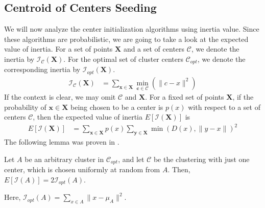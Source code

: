 \documentclass[twoside, 11pt]{article}
\newcommand{\x}{\mathbf{x}}
\newcommand{\X}{\mathbf{X}}
\newcommand{\y}{\mathbf{y}}
\renewcommand{\c}{\mathbf{c}}
\newcommand{\C}{\mathcal{C}}
\newcommand{\I}{\mathcal{I}}
\begin{document}
	\subsection{Centroid of Centers Seeding}
	We will now analyze the center initialization algorithms using inertia value. Since these algorithms are probabilistic, we are going to take a look at the expected value of inertia. For a set of points $\X$ and a set of centers $\C$, we denote the inertia by $\I_\C(\X)$. For the optimal set of cluster centers $\C_{opt}$, we denote the corresponding inertia by $\I_{opt}(\X)$.
		\begin{align*}
			\I_\C(\X) & = \sum_{\x\in\X}\min_{\c\in\C}(\|c-x\|^2)
		\end{align*}
	If the context is clear, we may omit $\C$ and $\X$. For a fixed set of points $\X$, if the probability of $\x\in\X$ being chosen to be a center is $p(x)$ with respect to a set of centers $\C$, then the expected value of inertia $E[\I(\X)]$ is
		\begin{align*}
			E[\I(\X)] & = \sum_{\x\in\X}p(x)\sum_{\y\in\X}\min(D(x),\|y-x\|)^2
		\end{align*}
	The following lemma was proven in \cite[Lemma $3.2$]{kmeans++}.
		\begin{lemma}
			Let $A$ be an arbitrary cluster in $\C_{opt}$, and let $\C$ be the clustering with just one center, which is chosen uniformly at random from $A$. Then, $E[\I(A)]=2\I_{opt}(A)$.
		\end{lemma}
	Here, $\I_{opt}(A)=\sum_{x\in A}\|x-\mu_A\|^2$. 
	
\end{document}
